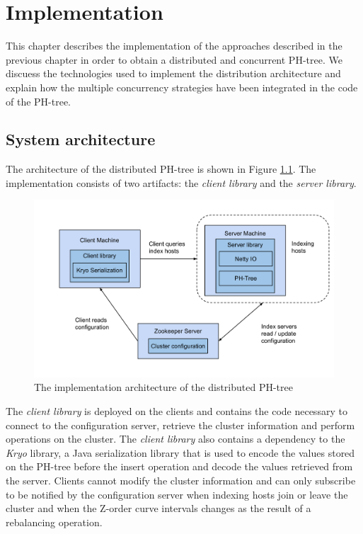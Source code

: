 \documentclass[11pt,a4paper]{globis-book}
\begin{document}
\chapter{Implementation}
\label{ch:implementation}

This chapter describes the implementation of the approaches described in the previous chapter in order to obtain a distributed and concurrent PH-tree. We discuess the technologies used to implement the distribution architecture and explain how the multiple concurrency strategies have been integrated in the code of the PH-tree. 

\section{System architecture}

The architecture of the distributed PH-tree is shown in Figure \ref{fig:implementation-architecture}. The implementation consists of two artifacts: the \textit{client library} and the \textit{server library}.

\begin{figure}[h]
    \centering 
    \includegraphics[scale=0.4]{images/implementation-architecture}
    \caption{The implementation architecture of the distributed PH-tree}
    \label{fig:implementation-architecture}
\end{figure}

The \textit{client library} is deployed on the clients and contains the code necessary to connect to the configuration server, retrieve the cluster information and perform operations on the cluster. The \textit{client library} also contains a dependency to the \textit{Kryo} library, a Java serialization library that is used to encode the values stored on the PH-tree before the insert operation and decode the values retrieved from the server. Clients cannot modify the cluster information and can only subscribe to be notified by the configuration server when indexing hosts join or leave the cluster and when the Z-order curve intervals changes as the result of a rebalancing operation.
\end{document}
